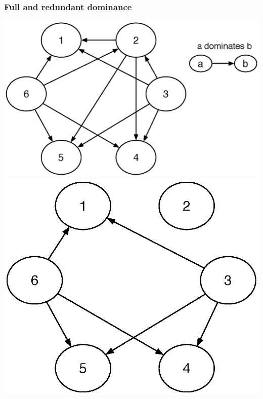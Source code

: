 \documentclass{beamer}
\begin{document}
\begin{frame}
\frametitle{Full and redundant dominance }

 \includegraphics[scale=0.4]{pic/dominance1.eps}
\includegraphics[scale = 0.4]{pic/dominance2.eps}
\end{frame}
\end{document}
